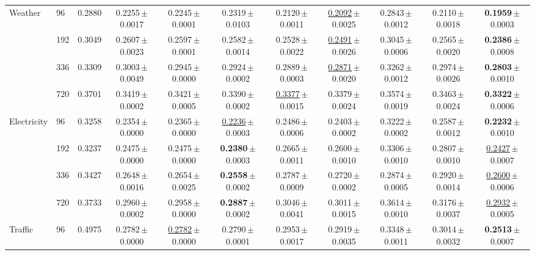 \begin{tabular}{llccccccccc}
\midrule
\multirow{4}{*}{Weather} & 96 & 0.2880 & 0.2255\,{\tiny$\pm$0.0017} & 0.2245\,{\tiny$\pm$0.0001} & 0.2319\,{\tiny$\pm$0.0103} & 0.2120\,{\tiny$\pm$0.0011} & \underline{0.2092}\,{\tiny$\pm$0.0025} & 0.2843\,{\tiny$\pm$0.0012} & 0.2110\,{\tiny$\pm$0.0018} & \textbf{0.1959}\,{\tiny$\pm$0.0003} \\
 & 192 & 0.3049 & 0.2607\,{\tiny$\pm$0.0023} & 0.2597\,{\tiny$\pm$0.0001} & 0.2582\,{\tiny$\pm$0.0014} & 0.2528\,{\tiny$\pm$0.0022} & \underline{0.2491}\,{\tiny$\pm$0.0026} & 0.3045\,{\tiny$\pm$0.0006} & 0.2565\,{\tiny$\pm$0.0020} & \textbf{0.2386}\,{\tiny$\pm$0.0008} \\
 & 336 & 0.3309 & 0.3003\,{\tiny$\pm$0.0049} & 0.2945\,{\tiny$\pm$0.0000} & 0.2924\,{\tiny$\pm$0.0002} & 0.2889\,{\tiny$\pm$0.0003} & \underline{0.2871}\,{\tiny$\pm$0.0020} & 0.3262\,{\tiny$\pm$0.0012} & 0.2974\,{\tiny$\pm$0.0026} & \textbf{0.2803}\,{\tiny$\pm$0.0010} \\
 & 720 & 0.3701 & 0.3419\,{\tiny$\pm$0.0002} & 0.3421\,{\tiny$\pm$0.0005} & 0.3390\,{\tiny$\pm$0.0002} & \underline{0.3377}\,{\tiny$\pm$0.0015} & 0.3379\,{\tiny$\pm$0.0024} & 0.3574\,{\tiny$\pm$0.0019} & 0.3463\,{\tiny$\pm$0.0024} & \textbf{0.3322}\,{\tiny$\pm$0.0006} \\
\midrule
\multirow{4}{*}{Electricity} & 96 & 0.3258 & 0.2354\,{\tiny$\pm$0.0000} & 0.2365\,{\tiny$\pm$0.0000} & \underline{0.2236}\,{\tiny$\pm$0.0003} & 0.2486\,{\tiny$\pm$0.0006} & 0.2403\,{\tiny$\pm$0.0002} & 0.3222\,{\tiny$\pm$0.0002} & 0.2587\,{\tiny$\pm$0.0012} & \textbf{0.2232}\,{\tiny$\pm$0.0010} \\
 & 192 & 0.3237 & 0.2475\,{\tiny$\pm$0.0000} & 0.2475\,{\tiny$\pm$0.0000} & \textbf{0.2380}\,{\tiny$\pm$0.0003} & 0.2665\,{\tiny$\pm$0.0011} & 0.2600\,{\tiny$\pm$0.0010} & 0.3306\,{\tiny$\pm$0.0010} & 0.2807\,{\tiny$\pm$0.0010} & \underline{0.2427}\,{\tiny$\pm$0.0007} \\
 & 336 & 0.3427 & 0.2648\,{\tiny$\pm$0.0016} & 0.2654\,{\tiny$\pm$0.0025} & \textbf{0.2558}\,{\tiny$\pm$0.0002} & 0.2787\,{\tiny$\pm$0.0009} & 0.2720\,{\tiny$\pm$0.0002} & 0.2874\,{\tiny$\pm$0.0005} & 0.2920\,{\tiny$\pm$0.0014} & \underline{0.2600}\,{\tiny$\pm$0.0006} \\
 & 720 & 0.3733 & 0.2960\,{\tiny$\pm$0.0002} & 0.2958\,{\tiny$\pm$0.0000} & \textbf{0.2887}\,{\tiny$\pm$0.0002} & 0.3046\,{\tiny$\pm$0.0041} & 0.3011\,{\tiny$\pm$0.0015} & 0.3614\,{\tiny$\pm$0.0010} & 0.3176\,{\tiny$\pm$0.0037} & \underline{0.2932}\,{\tiny$\pm$0.0005} \\
\midrule
\multirow{4}{*}{Traffic} & 96 & 0.4975 & 0.2782\,{\tiny$\pm$0.0000} & \underline{0.2782}\,{\tiny$\pm$0.0000} & 0.2790\,{\tiny$\pm$0.0001} & 0.2953\,{\tiny$\pm$0.0017} & 0.2919\,{\tiny$\pm$0.0035} & 0.3348\,{\tiny$\pm$0.0011} & 0.3014\,{\tiny$\pm$0.0032} & \textbf{0.2513}\,{\tiny$\pm$0.0007} \\

\end{tabular}
